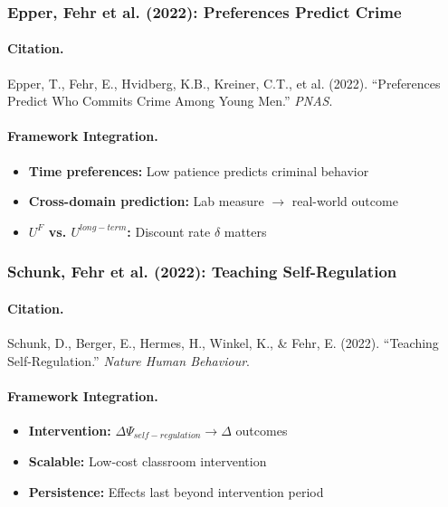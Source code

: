 \documentclass[12pt,a4paper]{article}
\begin{document}
\subsubsection{Epper, Fehr et al. (2022): Preferences Predict Crime}

\paragraph{Citation.}
Epper, T., Fehr, E., Hvidberg, K.B., Kreiner, C.T., et al. (2022).
``Preferences Predict Who Commits Crime Among Young Men.'' \emph{PNAS}.

\paragraph{Framework Integration.}
\begin{itemize}
  \item \textbf{Time preferences:} Low patience predicts criminal behavior
  \item \textbf{Cross-domain prediction:} Lab measure $\to$ real-world outcome
  \item \textbf{$U^F$ vs. $U^{long-term}$:} Discount rate $\delta$ matters
\end{itemize}

\subsubsection{Schunk, Fehr et al. (2022): Teaching Self-Regulation}

\paragraph{Citation.}
Schunk, D., Berger, E., Hermes, H., Winkel, K., \& Fehr, E. (2022).
``Teaching Self-Regulation.'' \emph{Nature Human Behaviour}.

\paragraph{Framework Integration.}
\begin{itemize}
  \item \textbf{Intervention:} $\Delta\Psi_{self-regulation} \to \Delta$ outcomes
  \item \textbf{Scalable:} Low-cost classroom intervention
  \item \textbf{Persistence:} Effects last beyond intervention period
\end{itemize}
\end{document}
